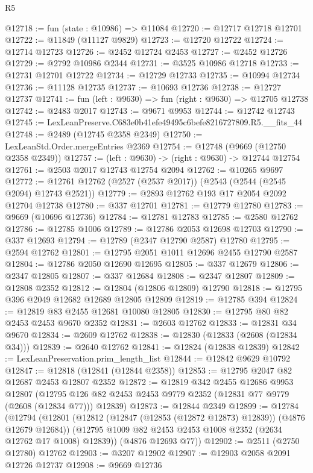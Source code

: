 \begin{lexlean}{R5}
\begin{coremodule}
@12718 := fun (state : @10986) => @11084
@12720 := @12717 @12718 @12701
@12722 := @11849 (@11127 @9829)
@12723 := @12720 @12722
@12724 := @12714 @12723
@12726 := @2452 @12724 @2453
@12727 := @2452 @12726
@12729 := @2792 @10986 @2344
@12731 := @3525 @10986 @12718
@12733 := @12731 @12701 @12722
@12734 := @12729 @12733
@12735 := @10994 @12734
@12736 := @11128 @12735
@12737 := @10693 @12736
@12738 := @12727 @12737
@12741 := fun (left : @9630) => fun (right : @9630) => @12705 @12738
@12742 := @2483 @2017
@12743 := @9671 @9953
@12744 := @12742 @12743
@12745 := LexLeanPreserve.C683e0b41efe49495c6befe8216727809.R5.__fits_44
@12748 := @2489 (@12745 @2358 @2349)
@12750 := LexLeanStd.Order.mergeEntries @2369
@12754 := @12748 (@9669 (@12750 @2358 @2349))
@12757 := (left : @9630) -> (right : @9630) -> @12744 @12754
@12761 := @2503 @2017 @12743 @12754 @2094
@12762 := @10265 @9697
@12772 := @12761 @12762 (@2527 (@2537 @2017)) (@2543 (@2544 (@2545 @2094) @12743 @2521))
@12779 := @2893 @12762 @193 @17 @2054 @2092 @12704 @12738
@12780 := @337 @12701
@12781 := @12779 @12780
@12783 := @9669 (@10696 @12736)
@12784 := @12781 @12783
@12785 := @2580 @12762
@12786 := @12785 @1006
@12789 := @12786 @2053 @12698 @12703
@12790 := @337 @12693
@12794 := @12789 (@2347 @12790 @2587) @12780
@12795 := @2594 @12762
@12801 := @12795 @2051 @1011 @12696 @2455 @12790 @2587
@12804 := @12786 @2050 @12690 @12695
@12805 := @337 @12679
@12806 := @2347 @12805
@12807 := @337 @12684
@12808 := @2347 @12807
@12809 := @12808 @2352
@12812 := @12804 (@12806 @12809) @12790
@12818 := @12795 @396 @2049 @12682 @12689 @12805 @12809
@12819 := @12785 @394
@12824 := @12819 @83 @2455 @12681 @10080 @12805
@12830 := @12795 @80 @82 @2453 @2453 @9670 @2352
@12831 := @2603 @12762
@12833 := @12831 @34 @9670
@12834 := @2609 @12762
@12838 := @12830 (@12833 (@2608 (@12834 @34)))
@12839 := @2640 @12762
@12841 := @12824 (@12838 @12839)
@12842 := LexLeanPreservation.prim_length_list
@12844 := @12842 @9629 @10792
@12847 := @12818 (@12841 (@12844 @2358))
@12853 := @12795 @2047 @82 @12687 @2453 @12807 @2352
@12872 := @12819
    @342
    @2455
    @12686
    @9953
    @12807
    (@12795 @126 @82 @2453 @2453 @9779 @2352 (@12831 @77 @9779 (@2608 (@12834 @77))) @12839)
@12873 := @12844 @2349
@12899 := @12784
    (@12794
      (@12801
        (@12812 (@12847 (@12853 (@12872 @12873) @12839)) (@4876 @12679 @12684))
        (@12795 @1009 @82 @2453 @2453 @1008 @2352 (@2634 @12762 @17 @1008) @12839))
      (@4876 @12693 @77))
@12902 := @2511 (@2750 @12780) @12762
@12903 := @3207 @12902
@12907 := @12903 @2058 @2091 @12726 @12737
@12908 := @9669 @12736

\end{coremodule}
\end{lexlean}
